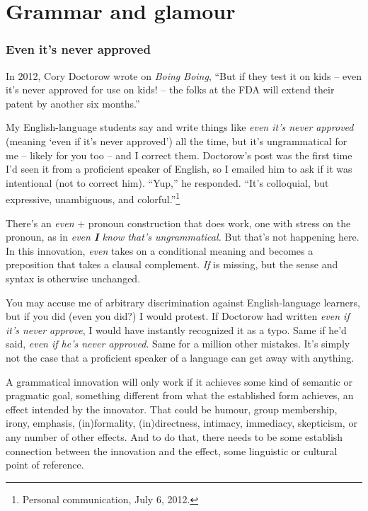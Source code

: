\chapter{Grammar and glamour}


\subsection{Even it's never approved}

In 2012, Cory Doctorow wrote on \textit{Boing Boing}, ``But if they test it on kids -- even it's never approved for use on kids! -- the folks at the FDA will extend their patent by another six months.''

My English-language students say and write things like \textit{even it's never approved} (meaning `even if it's never approved') all the time, but it's ungrammatical for me -- likely for you too -- and I correct them. Doctorow's post was the first time I'd seen it from a proficient speaker of English, so I emailed him to ask if it was intentional (not to correct him). ``Yup,'' he responded. ``It's colloquial, but expressive, unambiguous, and colorful.''\footnote{Personal communication, July 6, 2012.}

There's an \textit{even} + pronoun construction that does work, one with stress on the pronoun, as in \textit{even \textbf{I} know that's ungrammatical.} But that's not happening here. In this innovation, \textit{even} takes on a conditional meaning and becomes a preposition that takes a clausal complement. \textit{If} is missing, but the sense and syntax is otherwise unchanged.

You may accuse me of arbitrary discrimination against English-language learners, but if you did (even you did?) I would protest. If Doctorow had written \textit{even if it's never approve}, I would have instantly recognized it as a typo. Same if he'd said, \textit{even if he's never approved}. Same for a million other mistakes. It's simply not the case that a proficient speaker of a language can get away with anything.

A grammatical innovation will only work if it achieves some kind of semantic or pragmatic goal, something different from what the established form achieves, an effect intended by the innovator. That could be humour, group membership, irony, emphasis, (in)formality, (in)directness, intimacy, immediacy, skepticism, or any number of other effects. And to do that, there needs to be some establish connection between the innovation and the effect, some linguistic or cultural point of reference.

